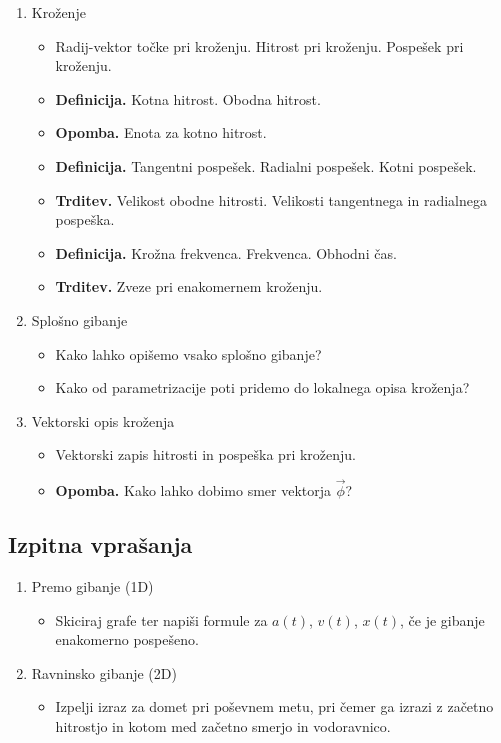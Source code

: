 \begin{enumerate}
    \item Kroženje
    \begin{itemize}
        \item Radij-vektor točke pri kroženju. Hitrost pri kroženju. Pospešek pri kroženju.
        \item \textbf{Definicija.} Kotna hitrost. Obodna hitrost. 
        \item \textbf{Opomba.} Enota za kotno hitrost.
        \item \textbf{Definicija.} Tangentni pospešek. Radialni pospešek. Kotni pospešek. 
        \item \textbf{Trditev.} Velikost obodne hitrosti. Velikosti tangentnega in radialnega pospeška.
        \item \textbf{Definicija.} Krožna frekvenca. Frekvenca. Obhodni čas.
        \item \textbf{Trditev.} Zveze pri enakomernem kroženju.
    \end{itemize}

    \item Splošno gibanje
    \begin{itemize}
        \item Kako lahko opišemo vsako splošno gibanje?
        \item Kako od parametrizacije poti pridemo do lokalnega opisa kroženja?
    \end{itemize}

    \item Vektorski opis kroženja
    \begin{itemize}
        \item Vektorski zapis hitrosti in pospeška pri kroženju.
        \item \textbf{Opomba.} Kako lahko dobimo smer vektorja \(\vec{\phi}\)?
    \end{itemize}
\end{enumerate}

\newpage
\subsection*{Izpitna vprašanja}
\begin{enumerate}
    \item Premo gibanje (1D)
    \begin{itemize}
        \item Skiciraj grafe ter napiši formule za \(a(t)\), \(v(t)\), \(x(t)\), če je gibanje enakomerno pospešeno.
    \end{itemize}

    \item Ravninsko gibanje (2D)
    
    \begin{itemize}
        \item Izpelji izraz za domet pri poševnem metu, pri čemer ga izrazi z začetno hitrostjo in kotom med začetno smerjo in vodoravnico.
    \end{itemize}
\end{enumerate}